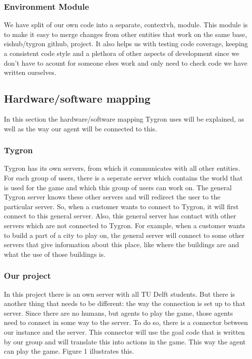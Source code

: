 \subsubsection{Environment Module}

We have split of our own code into a separate, contextvh, module. 
This module is to make it easy to merge changes from other entities that work on the same base, eishub/tygron github, project.
It also helps us with testing code coverage, keeping a consistent code style and a plethora of other aspects of development since we don't have to acount for someone elses work and only need to check code we have written ourselves.


\newpage
\subsection{Hardware/software mapping}
In this section the hardware/software mapping Tygron uses will be explained, as well as the way our agent will be connected to this.

\subsubsection{Tygron}
Tygron has its own servers, from which it communicates with all other entities. For each group of users, there is a seperate server which contains the world that is used for the game and which this group of users can work on. The general Tygron server knows these other servers and will redirect the user to the particular server. So, when a customer wants to connect to Tygron, it will first connect to this general server. Also, this general server has contact with other servers which are not connected to Tygron. For example, when a customer wants to build a part of a city to play on, the general server will connect to some other servers that give information about this place, like where the buildings are and what the use of those buildings is. 

\subsubsection{Our project}

In this project there is an own server with all TU Delft students. But there is another thing that needs to be different: the way the connection is set up to that server. Since there are no humans, but agents to play the game, those agents need to connect in some way to the server. To do so, there is a connector between our instance and the server. This connector will use the goal code that is written by our group and will translate this into actions in the game. This way the agent can play the game. Figure 1 illustrates this.

